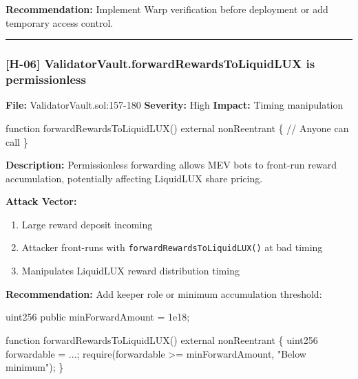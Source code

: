 \documentclass[
]{article}
\newenvironment{Shaded}{}{}
\newcommand{\NormalTok}[1]{#1}
\providecommand{\tightlist}{%
  \setlength{\itemsep}{0pt}\setlength{\parskip}{0pt}}
\begin{document}
\textbf{Recommendation:} Implement Warp verification before deployment
or add temporary access control.

\begin{center}\rule{0.5\linewidth}{0.5pt}\end{center}

\subsubsection{{[}H-06{]} ValidatorVault.forwardRewardsToLiquidLUX is
permissionless}\label{h-06-validatorvaultforwardrewardstoliquidlux-is-permissionless}

\textbf{File:} ValidatorVault.sol:157-180 \textbf{Severity:} High
\textbf{Impact:} Timing manipulation

\begin{Shaded}
\begin{Highlighting}[]
\NormalTok{function forwardRewardsToLiquidLUX() external nonReentrant \{}
\NormalTok{    // Anyone can call}
\NormalTok{\}}
\end{Highlighting}
\end{Shaded}

\textbf{Description:} Permissionless forwarding allows MEV bots to
front-run reward accumulation, potentially affecting LiquidLUX share
pricing.

\textbf{Attack Vector:}

\begin{enumerate}
\def\labelenumi{\arabic{enumi}.}
\tightlist
\item
  Large reward deposit incoming
\item
  Attacker front-runs with \texttt{forwardRewardsToLiquidLUX()} at bad
  timing
\item
  Manipulates LiquidLUX reward distribution timing
\end{enumerate}

\textbf{Recommendation:} Add keeper role or minimum accumulation
threshold:

\begin{Shaded}
\begin{Highlighting}[]
\NormalTok{uint256 public minForwardAmount = 1e18;}

\NormalTok{function forwardRewardsToLiquidLUX() external nonReentrant \{}
\NormalTok{    uint256 forwardable = ...;}
\NormalTok{    require(forwardable \textgreater{}= minForwardAmount, "Below minimum");}
\NormalTok{\}}
\end{Highlighting}
\end{Shaded}
\end{document}

